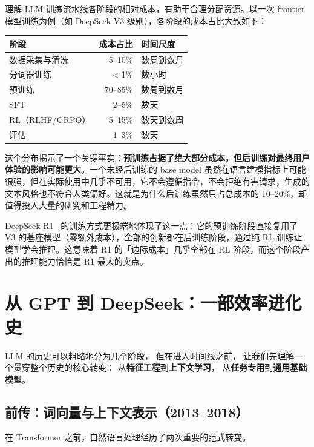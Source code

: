 理解 LLM 训练流水线各阶段的相对成本，有助于合理分配资源。以一次 frontier 模型训练为例（如 DeepSeek-V3 级别），各阶段的成本占比大致如下：

\begin{center}\small
\renewcommand{\arraystretch}{1.3}
\begin{tabular}{lrl}
\toprule
\rowcolor{figLightGray}
\textbf{阶段} & \textbf{成本占比} & \textbf{时间尺度} \\
\midrule
数据采集与清洗    & 5--10\%   & 数周到数月 \\
分词器训练        & $<$1\%    & 数小时 \\
预训练            & 70--85\%  & 数周到数月 \\
SFT               & 2--5\%    & 数天 \\
RL（RLHF/GRPO）   & 5--15\%   & 数天到数周 \\
评估              & 1--3\%    & 数天 \\
\bottomrule
\end{tabular}
\end{center}

这个分布揭示了一个关键事实：\textbf{预训练占据了绝大部分成本，但后训练对最终用户体验的影响可能更大}。一个未经后训练的 base model 虽然在语言建模指标上可能很强，但在实际使用中几乎不可用，它不会遵循指令，不会拒绝有害请求，生成的文本风格也不符合人类偏好。这就是为什么后训练虽然只占总成本的 10--20\%，却值得投入大量的研究和工程精力。

DeepSeek-R1~\cite{deepseekr1} 的训练方式更极端地体现了这一点：它的预训练阶段直接复用了 V3 的基座模型（零额外成本），全部的创新都在后训练阶段，通过纯 RL 训练让模型学会推理。这意味着 R1 的「边际成本」几乎全部在 RL 阶段，而这个阶段产出的推理能力恰恰是 R1 最大的卖点。

\section{从 GPT 到 DeepSeek：一部效率进化史}

LLM 的历史可以粗略地分为几个阶段，
但在进入时间线之前，
让我们先理解一个贯穿整个历史的核心转变：
从\textbf{特征工程}到\textbf{上下文学习}，
从\textbf{任务专用}到\textbf{通用基础模型}。

\subsection{前传：词向量与上下文表示（2013--2018）}

在 Transformer 之前，自然语言处理经历了两次重要的范式转变。

